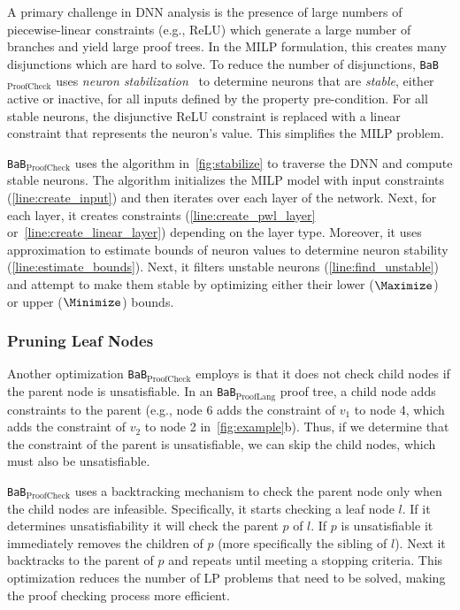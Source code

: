 \documentclass[oneside,11pt,dvipsnames]{book}
\numberwithin{equation}{section}
\theoremstyle{definition}
\theoremstyle{remark}
\newcommand{\hd}[1]{\iftoggle{usecomment}{{\color{blue}{[HD]: #1}}}{}}
\newcommand{\prooflang}{\texttt{BaB$_{\text{ProofLang}}$}}
\newcommand{\proofcheck}{\texttt{BaB$_{\text{ProofCheck}}$}}
\begin{document}
A primary challenge in DNN analysis is the presence of large numbers of piecewise-linear constraints (e.g., ReLU) which generate a large number of branches and yield large proof trees. In the MILP formulation, this creates many disjunctions which are hard to solve. To reduce the number of disjunctions, \proofcheck{} uses \emph{neuron stabilization}~\cite{duong2024harnessing}
to determine neurons that are \emph{stable}, either active or inactive, for all inputs defined by the property pre-condition.
For all stable neurons, the disjunctive ReLU constraint is replaced with a linear constraint that represents the neuron's value.   This simplifies the MILP problem.

\proofcheck{} uses the algorithm in~\autoref{fig:stabilize} to traverse the DNN and compute stable neurons. The algorithm initializes the MILP model with input constraints (\autoref{line:create_input}) and then iterates over each layer of the network. 
Next, for each layer, it creates constraints (\autoref{line:create_pwl_layer} or~\autoref{line:create_linear_layer}) depending on the layer type.
Moreover,  it uses approximation to estimate bounds of neuron values to determine neuron stability (\autoref{line:estimate_bounds}).
Next, it filters unstable neurons (\autoref{line:find_unstable}) and attempt to make them stable by optimizing either their lower ($\Maximize$) or upper ($\Minimize$) bounds.



\subsubsection{Pruning Leaf Nodes}\label{sec:pruning}

Another optimization \proofcheck{} employs is that it does not check child nodes if the parent node is unsatisfiable.
In an \prooflang{} proof tree, a child node adds constraints to the parent (e.g., node 6 adds the constraint of $v_1$ to node 4, which adds the constraint of $v_2$ to node 2 in~\autoref{fig:example}b). Thus, if we determine that the constraint of the parent is unsatisfiable, we can skip the child nodes, which must also be unsatisfiable.  


\proofcheck{} uses a backtracking mechanism to check the parent node only when the child nodes are infeasible. Specifically, it starts checking a leaf node $l$. If it determines unsatisfiability it will check the parent $p$ of $l$. If $p$ is unsatisfiable it immediately removes the children of $p$ (more specifically the sibling of $l$). Next it backtracks to the parent of $p$ and repeats until meeting a stopping criteria. This optimization reduces the number of LP problems that need to be solved, making the proof checking process more efficient. 
\end{document}

